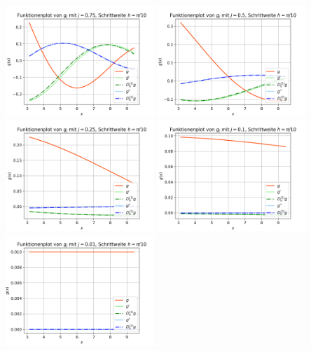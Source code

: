 \documentclass{scrartcl}
\begin{document}
{    \vspace{0.5cm}
    \includegraphics[width=0.42\textwidth]{Grafiken/Funktionenplot_j075_Pi_Zehntel}
    \includegraphics[width=0.42\textwidth]{Grafiken/Funktionenplot_j05_Pi_Zehntel}\\
    \includegraphics[width=0.42\textwidth]{Grafiken/Funktionenplot_j025_Pi_Zehntel}
    \includegraphics[width=0.42\textwidth]{Grafiken/Funktionenplot_j01_Pi_Zehntel}\\
    \includegraphics[width=0.42\textwidth]{Grafiken/Funktionenplot_j001_Pi_Zehntel}
}
\end{document}
